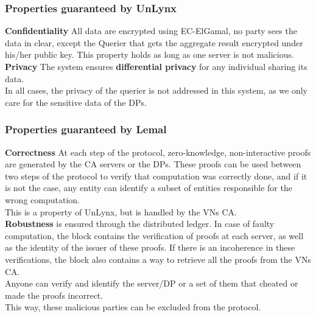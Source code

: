 \documentclass{article}
\begin{document}
\subsubsection{Properties guaranteed by UnLynx}
\textbf{Confidentiality} All data are encrypted using EC-ElGamal, no party sees the data in clear, except the Querier that gets the aggregate result encrypted under his/her public key. This property holds as long as one server is not malicious.\\
\textbf{Privacy} The system ensures \textbf{differential privacy} for any individual sharing its data.\\
In all cases, the privacy of the querier is not addressed in this system, as we only care for the sensitive data of the DPs.\\
\subsubsection{Properties guaranteed by Lemal}
\textbf{Correctness} At each step of the protocol, zero-knowledge, non-interactive proofs are generated by the CA servers or the DPs. These proofs can be used between two steps of the protocol to verify that computation was correctly done, and if it is not the case, any entity can identify a subset of entities responsible for the wrong computation.\\
This is a property of UnLynx, but is handled by the VNs CA.\\
\textbf{Robustness} is ensured through the distributed ledger. In case of faulty computation, the block contains the verification of proofs at each server, as well as the identity of the issuer of these proofs.
If there is an incoherence in these verifications, the block also contains a way to retrieve all the proofs from the VNs CA.\\
Anyone can verify and identify the server/DP or a set of them that cheated or made the proofs incorrect.\\
This way, these malicious parties can be excluded from the protocol.
\end{document}
